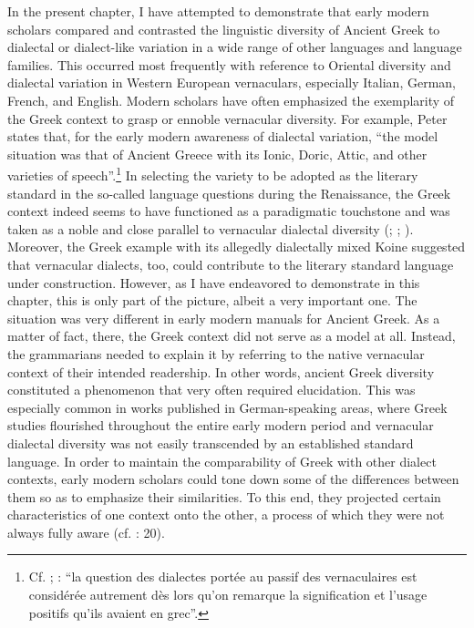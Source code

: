 In the present chapter, I have attempted to demonstrate that early modern scholars compared and contrasted the linguistic diversity of Ancient Greek to dialectal or dialect-like variation in a wide range of other languages and language families. This occurred most frequently with reference to Oriental diversity and dialectal variation in Western European vernaculars, especially Italian, German, French, and English. Modern scholars have often emphasized the exemplarity of the Greek context to grasp or ennoble vernacular diversity. For example, Peter \citet[35--36]{Burke2004} states that, for the early modern awareness of dialectal variation, “the model situation was that of Ancient Greece with its Ionic, Doric, Attic, and other varieties of speech”.\footnote{Cf. \citet[923]{Haugen1966}; \citet[216]{Giard1992}: “la question des dialectes portée au passif des vernaculaires est considérée autrement dès lors qu’on remarque la signification et l’usage positifs qu’ils avaient en grec”.} In selecting the variety to be adopted as the literary standard in the so-called language questions during the Renaissance, the Greek context indeed seems to have functioned as a paradigmatic touchstone and was taken as a noble and close parallel to vernacular dialectal diversity (\citealt{Alinei1984}; \citealt{Trovato1984}; \citealt{Trapp1990}). Moreover, the Greek example with its allegedly dialectally mixed Koine suggested that vernacular dialects, too, could contribute to the literary standard language under construction. However, as I have endeavored to demonstrate in this chapter, this is only part of the picture, albeit a very important one. The situation was very different in early modern manuals for Ancient Greek. As a matter of fact, there, the Greek context did not serve as a model at all. Instead, the grammarians needed to explain it by referring to the native vernacular context of their intended readership. In other words, ancient Greek diversity constituted a phenomenon that very often required elucidation. This was especially common in works published in German-speaking areas, where Greek studies flourished throughout the entire early modern period and vernacular dialectal diversity was not easily transcended by an established standard language. In order to maintain the comparability of Greek with other dialect contexts, early modern scholars could tone down some of the differences between them so as to emphasize their similarities. To this end, they projected certain characteristics of one context onto the other, a process of which they were not always fully aware (cf. \citealt{Alinei1980}: 20).

